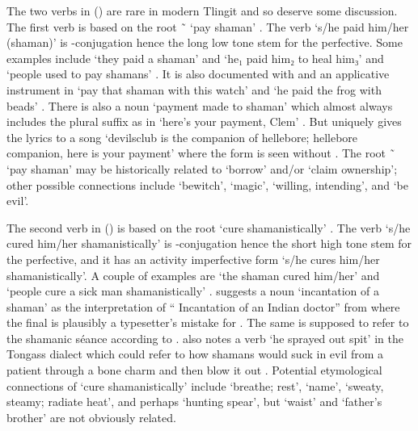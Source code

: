 The two verbs in (\lastx) are rare in modern Tlingit and so deserve some discussion.
The first verb is based on the root  \~\  ‘pay shaman’ \parencite[3]{leer:1978b}.
The verb  ‘s/he paid him/her (shaman)’ is -conjugation hence the long low tone stem  for the perfective.
Some examples include  ‘they paid a shaman’ and  ‘he₁ paid him₂ to heal him₃’ \parencite[01/127]{leer:1973} and  ‘people used to pay shamans’ \parencite[146.1989]{story-naish:1973}.
It is also documented with  and an applicative instrument  in  ‘pay that shaman with this watch’ \parencite[146.1988]{story-naish:1973} and  ‘he paid the frog with beads’ \parencite[01/127]{leer:1973}.
There is also a noun  ‘payment made to shaman’ which almost always includes the plural suffix  as in  ‘here’s your payment, Clem’ \parencite[01/126]{leer:1973}.
But \citeauthor{leer:1973} uniquely gives the lyrics to a song  ‘devilsclub is the companion of hellebore; hellebore companion, here is your payment’ where the form  is seen without  \parencite[01/127]{leer:1973}.
The root  \~\  ‘pay shaman’ may be historically related to  ‘borrow’ and/or  ‘claim ownership’; other possible connections include  ‘bewitch’,  ‘magic’,  ‘willing, intending’, and  ‘be evil’.

The second verb in (\lastx) is based on the root  ‘cure shamanistically’ \parencite[36]{leer:1978b}.
The verb  ‘s/he cured him/her shamanistically’ is -conjugation hence the short high tone stem  for the perfective, and it has an activity imperfective form  ‘s/he cures him/her shamanistically’.
A couple of examples are  ‘the shaman cured him/her’ and  ‘people cure a sick man shamanistically’ \parencite[60.691–692]{story-naish:1973}.
\citeauthor{leer:1973} suggests a noun  ‘incantation of a shaman’ \parencite[09/19]{leer:1973} as the interpretation of “ Incantation of an Indian doctor” from \textcite[765]{kelly-willard:1905} where the final  is plausibly a typesetter’s mistake for .
The same  is supposed to refer to the shamanic séance according to \textcite[382]{emmons:1991}.
\citeauthor{leer:1973} also notes a verb  ‘he sprayed out spit’ in the Tongass dialect \parencite[09/19]{leer:1973} which could refer to how shamans would suck in evil from a patient through a bone charm and then blow it out \parencites[708]{de-laguna:1972}[384]{emmons:1991}.
Potential etymological connections of  ‘cure shamanistically’ include  ‘breathe; rest’,  ‘name’,  ‘sweaty, steamy; radiate heat’, and perhaps  ‘hunting spear’, but  ‘waist’ and  ‘father’s brother’ are not obviously related.

